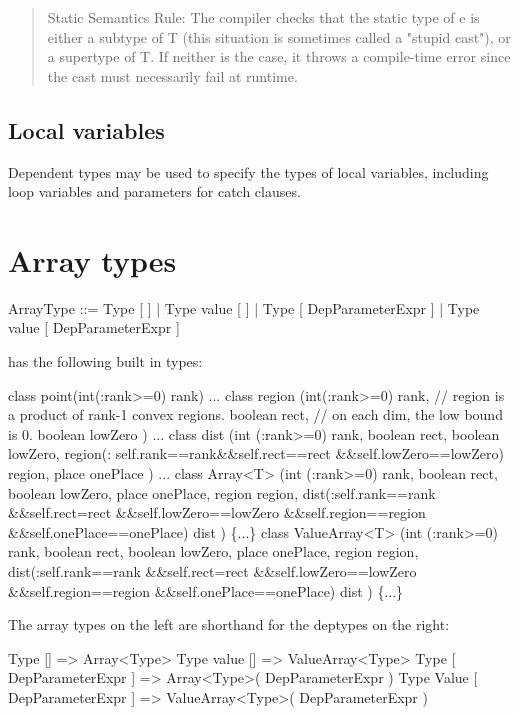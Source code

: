   \begin{quotation}
 {\sc  Static Semantics Rule:}
    The compiler checks that the static type of e is either a subtype
    of T (this situation is sometimes called a "stupid cast"), or a
    supertype of T. If neither is the case, it throws a compile-time
    error since the cast must necessarily fail at runtime.     
   \end{quotation}

\subsection{Local variables}

Dependent types may be used to specify the types of local variables,
including loop variables and parameters for catch clauses.

\section{Array types}

\begin{x10}
    ArrayType ::= Type [  ] 
     | Type value  [  ]
     | Type [ DepParameterExpr ]
     | Type  value [ DepParameterExpr ]  
\end{x10}

\Xten{} has the following built in types:

\begin{x10}
class point(int(:rank>=0) rank) { ...}
class region
  (int(:rank>=0) rank,
   // region is a product of rank-1 convex regions.
   boolean rect,  
   // on each dim, the low bound is 0. 
   boolean lowZero
  ) { ...}
class dist
  (int (:rank>=0) rank, 
   boolean rect,
   boolean lowZero,
   region(: self.rank==rank\&\&self.rect==rect
           \&\&self.lowZero==lowZero) region, 
   place onePlace 
   )  { ...}
class Array<T>
  (int (:rank>=0) rank,  
   boolean rect,
   boolean lowZero,
   place onePlace,
   region region,
   dist(:self.rank==rank \&\&self.rect=rect
         \&\&self.lowZero==lowZero
        \&\&self.region==region
        \&\&self.onePlace==onePlace) dist
    ) \{...\}
class ValueArray<T>
 (int (:rank>=0) rank,  
   boolean rect,
   boolean lowZero,
   place onePlace,
   region region,
   dist(:self.rank==rank \&\&self.rect=rect
        \&\&self.lowZero==lowZero
       \&\&self.region==region
       \&\&self.onePlace==onePlace) dist
) \{...\}
\end{x10}


The array types on the left are shorthand for the deptypes on the right:
\begin{x10}
Type []  => Array<Type>
Type value [] => ValueArray<Type>
Type  [ DepParameterExpr ] 
   => Array<Type>( DepParameterExpr )
Type Value [ DepParameterExpr ] 
   => ValueArray<Type>( DepParameterExpr )
\end{x10}


